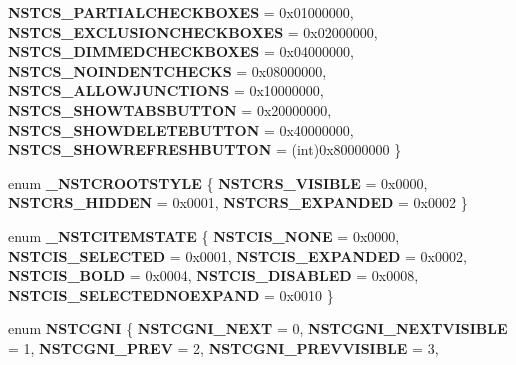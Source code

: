 \begin{DoxyCompactItemize}
{\bfseries N\+S\+T\+C\+S\+\_\+\+P\+A\+R\+T\+I\+A\+L\+C\+H\+E\+C\+K\+B\+O\+X\+ES} = 0x01000000, 
{\bfseries N\+S\+T\+C\+S\+\_\+\+E\+X\+C\+L\+U\+S\+I\+O\+N\+C\+H\+E\+C\+K\+B\+O\+X\+ES} = 0x02000000, 
\newline
{\bfseries N\+S\+T\+C\+S\+\_\+\+D\+I\+M\+M\+E\+D\+C\+H\+E\+C\+K\+B\+O\+X\+ES} = 0x04000000, 
{\bfseries N\+S\+T\+C\+S\+\_\+\+N\+O\+I\+N\+D\+E\+N\+T\+C\+H\+E\+C\+KS} = 0x08000000, 
{\bfseries N\+S\+T\+C\+S\+\_\+\+A\+L\+L\+O\+W\+J\+U\+N\+C\+T\+I\+O\+NS} = 0x10000000, 
{\bfseries N\+S\+T\+C\+S\+\_\+\+S\+H\+O\+W\+T\+A\+B\+S\+B\+U\+T\+T\+ON} = 0x20000000, 
\newline
{\bfseries N\+S\+T\+C\+S\+\_\+\+S\+H\+O\+W\+D\+E\+L\+E\+T\+E\+B\+U\+T\+T\+ON} = 0x40000000, 
{\bfseries N\+S\+T\+C\+S\+\_\+\+S\+H\+O\+W\+R\+E\+F\+R\+E\+S\+H\+B\+U\+T\+T\+ON} = (int)0x80000000
 \}
\item 
\mbox{\label{interface_i_name_space_tree_control_a67dc6344dc1679331b7f958435e271b4}} 
enum {\bfseries \+\_\+\+N\+S\+T\+C\+R\+O\+O\+T\+S\+T\+Y\+LE} \{ {\bfseries N\+S\+T\+C\+R\+S\+\_\+\+V\+I\+S\+I\+B\+LE} = 0x0000, 
{\bfseries N\+S\+T\+C\+R\+S\+\_\+\+H\+I\+D\+D\+EN} = 0x0001, 
{\bfseries N\+S\+T\+C\+R\+S\+\_\+\+E\+X\+P\+A\+N\+D\+ED} = 0x0002
 \}
\item 
\mbox{\label{interface_i_name_space_tree_control_a39ac682659ba05168852ffdc131753b9}} 
enum {\bfseries \+\_\+\+N\+S\+T\+C\+I\+T\+E\+M\+S\+T\+A\+TE} \{ \newline
{\bfseries N\+S\+T\+C\+I\+S\+\_\+\+N\+O\+NE} = 0x0000, 
{\bfseries N\+S\+T\+C\+I\+S\+\_\+\+S\+E\+L\+E\+C\+T\+ED} = 0x0001, 
{\bfseries N\+S\+T\+C\+I\+S\+\_\+\+E\+X\+P\+A\+N\+D\+ED} = 0x0002, 
{\bfseries N\+S\+T\+C\+I\+S\+\_\+\+B\+O\+LD} = 0x0004, 
\newline
{\bfseries N\+S\+T\+C\+I\+S\+\_\+\+D\+I\+S\+A\+B\+L\+ED} = 0x0008, 
{\bfseries N\+S\+T\+C\+I\+S\+\_\+\+S\+E\+L\+E\+C\+T\+E\+D\+N\+O\+E\+X\+P\+A\+ND} = 0x0010
 \}
\item 
\mbox{\label{interface_i_name_space_tree_control_a33078adee214c83e9781c6fb93965651}} 
enum {\bfseries N\+S\+T\+C\+G\+NI} \{ \newline
{\bfseries N\+S\+T\+C\+G\+N\+I\+\_\+\+N\+E\+XT} = 0, 
{\bfseries N\+S\+T\+C\+G\+N\+I\+\_\+\+N\+E\+X\+T\+V\+I\+S\+I\+B\+LE} = 1, 
{\bfseries N\+S\+T\+C\+G\+N\+I\+\_\+\+P\+R\+EV} = 2, 
{\bfseries N\+S\+T\+C\+G\+N\+I\+\_\+\+P\+R\+E\+V\+V\+I\+S\+I\+B\+LE} = 3, 

\end{DoxyCompactItemize}

